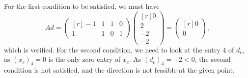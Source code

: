 \begin{enumerate}
   For the first condition to be satisfied, we must have
        \begin{equation*}
        Ad = \begin{pmatrix*}[r] -1 & 1 & 1 & 0 \\ 1 & 1 & 0 & 1 \end{pmatrix*} \begin{pmatrix*}[r] 0 \\ 2 \\ -2 \\ -2 \end{pmatrix*} = \begin{pmatrix*}[r] 0 \\ 0 \end{pmatrix*},
        \end{equation*}
        which is verified.
        For the second
        condition, we need to look at the entry 4 of $d_c$, as
        $({x}_c)_4=0$ is the only zero entry of $x_c$. As  $({d}_c)_4 = -2 < 0$, the second condition is not satisfied, and the  direction is not feasible at the given point.


\end{enumerate}
